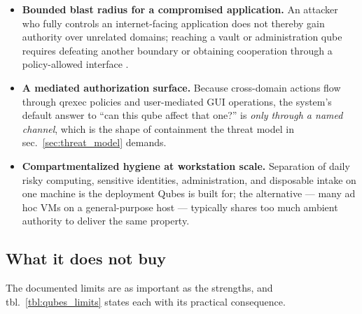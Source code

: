 \documentclass[
  english,
  9pt,
]{extarticle}
\providecommand{\tightlist}{%
  \setlength{\itemsep}{0pt}\setlength{\parskip}{0pt}}
\begin{document}
\begin{itemize}
\tightlist
\item
  \textbf{Bounded blast radius for a compromised application.} An
  attacker who fully controls an internet-facing application does not
  thereby gain authority over unrelated domains; reaching a vault or
  administration qube requires defeating another boundary or obtaining
  cooperation through a policy-allowed interface
  \citep{qubes_architecture}.
\item
  \textbf{A mediated authorization surface.} Because cross-domain
  actions flow through qrexec policies and user-mediated GUI operations,
  the system's default answer to ``can this qube affect that one?'' is
  \emph{only through a named channel}, which is the shape of containment
  the threat model in sec.~\ref{sec:threat_model} demands.
\item
  \textbf{Compartmentalized hygiene at workstation scale.} Separation of
  daily risky computing, sensitive identities, administration, and
  disposable intake on one machine is the deployment Qubes is built for;
  the alternative --- many ad hoc VMs on a general-purpose host ---
  typically shares too much ambient authority to deliver the same
  property.
\end{itemize}

\subsection{What it does not buy}\label{what-it-does-not-buy}

The documented limits are as important as the strengths, and
tbl.~\ref{tbl:qubes_limits} states each with its practical consequence.
\end{document}
